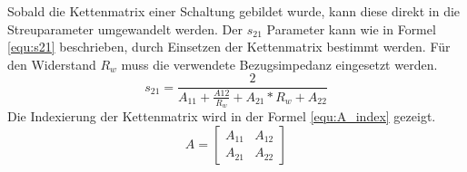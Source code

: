 Sobald die Kettenmatrix einer Schaltung gebildet wurde, kann diese direkt in die Streuparameter umgewandelt werden. Der $s_{21}$ Parameter kann wie in Formel \ref{equ:s21} beschrieben, durch Einsetzen der Kettenmatrix bestimmt werden. Für den Widerstand $R_w$ muss die verwendete Bezugsimpedanz eingesetzt werden.
\begin{equation}\label{equ:s21}
s_{21} = \frac{2}{A_{11}+\frac{A{12}}{R_w}+A_{21}*R_w+A_{22}}
\end{equation}
Die Indexierung der Kettenmatrix wird in der Formel \ref{equ:A_index} gezeigt.
\begin{equation}\label{equ:A_index}
	A = \left[\begin{matrix}
	A_{11}&A_{12}\\A_{21}&A_{22}
	\end{matrix}\right]
\end{equation}
\newpage

